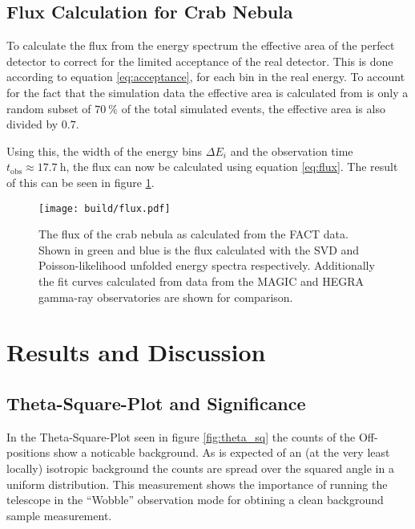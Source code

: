         \subsection{Flux Calculation for Crab Nebula}
            To calculate the flux from the energy spectrum the effective area of the perfect detector to correct for the limited acceptance of the real detector.
            This is done according to equation \eqref{eq:acceptance}, for each bin in the real energy.
            To account for the fact that the simulation data the effective area is calculated from is only a random subset of $\SI{70}{\percent}$ of the total simulated events, the effective area is also divided by $\num{0.7}$.

            Using this, the width of the energy bins $\Delta E_i$ and the observation time $t_\text{obs} \approx \SI{17.7}{\hour}$, the flux can now be calculated using equation \eqref{eq:flux}.
            The result of this can be seen in figure \ref{fig:flux}.
            \begin{figure}
                \centering
                \texttt{[image: build/flux.pdf]}
                \caption{
                    The flux of the crab nebula as calculated from the FACT data.
                    Shown in green and blue is the flux calculated with the SVD and Poisson-likelihood unfolded energy spectra respectively.
                    Additionally the fit curves calculated from data from the MAGIC\cite{MAGIC} and HEGRA\cite{HEGRA} gamma-ray observatories are shown for comparison.
                }
                \label{fig:flux}
            \end{figure}


%
%
    \section{Results and Discussion}
        \subsection{Theta-Square-Plot and Significance}
            In the Theta-Square-Plot seen in figure \ref{fig:theta_sq} the counts of the Off-positions show a noticable background.
            As is expected of an (at the very least locally) isotropic background the counts are spread over the squared angle in a uniform distribution.
            This measurement shows the importance of running the telescope in the \enquote{Wobble} observation mode for obtining a clean background sample measurement.

